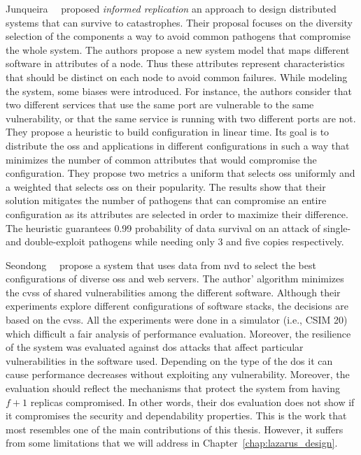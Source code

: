 Junqueira~\etal{}~\cite{Junqueira:2005} proposed \emph{informed replication} an approach to design distributed systems that can survive to catastrophes. 
Their proposal focuses on the diversity selection of the components a way to avoid common pathogens that compromise the whole system.
The authors propose a new system model that maps different software in attributes of a node. Thus these attributes represent characteristics that should be distinct on each node to avoid common failures.
While modeling the system, some biases were introduced.
For instance, the authors consider that two different services that use the same port are vulnerable to the same vulnerability, or that the same service is running with two different ports are not.
They propose a heuristic to build configuration in linear time.
Its goal is to distribute the \glspl{os} and applications in different configurations in such a way that minimizes the number of common attributes that would compromise the configuration.
They propose two metrics a uniform that selects \glspl{os} uniformly and a weighted that selects \glspl{os} on their popularity.
The results show that their solution mitigates the number of pathogens that can compromise an entire configuration as its attributes are selected in order to maximize their difference.
The heuristic guarantees 0.99 probability of data survival on an attack of single- and double-exploit pathogens while needing only 3 and five copies respectively.


Seondong~\etal{}~\cite{Seondong:2017} propose a system that uses data from \gls{nvd} to select the best configurations of diverse \glspl{os} and web servers.
The author' algorithm minimizes the \gls{cvss} of shared vulnerabilities among the different software.
Although their experiments explore different configurations of software stacks, the decisions are based on the \gls{cvss}.
All the experiments were done in a simulator (i.e., CSIM 20) which difficult a fair analysis of performance evaluation. 
Moreover, the resilience of the system was evaluated against \gls{dos} attacks that affect particular vulnerabilities in the software used.
Depending on the type of the \gls{dos} it can cause performance decreases without exploiting any vulnerability.
Moreover, the evaluation should reflect the mechanisms that protect the system from having $f+1$ replicas compromised.
In other words, their \gls{dos} evaluation does not show if it compromises the security and dependability properties. 
This is the work that most resembles one of the main contributions of this thesis. 
However, it suffers from some limitations that we will address in Chapter~\ref{chap:lazarus_design}.



